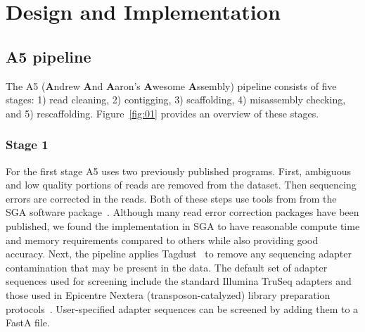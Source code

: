 \documentclass[10pt]{article}
\begin{document}
\section*{Design and Implementation}

\subsection*{A5 pipeline}

The A5 (\textbf{A}ndrew \textbf{A}nd \textbf{A}aron's \textbf{A}wesome \textbf{A}ssembly) pipeline consists of five 
stages: 1) read cleaning, 2) contigging, 3) scaffolding, 4) misassembly checking, and 5) rescaffolding. 
Figure~\ref{fig:01} provides an overview of these stages. 

\subsubsection*{Stage 1}
For the first stage A5 uses two previously published programs. First, 
ambiguous and low quality portions of reads are removed from the dataset. Then sequencing errors are corrected in the reads. Both of these 
steps use tools from from the SGA software package~\cite{Simpson2010}.  Although many read error correction packages have been published,
we found the implementation in SGA to have reasonable compute time and memory requirements compared to others while also providing 
good accuracy.  Next, the pipeline applies Tagdust~\cite{Lassmann2009} to remove any 
sequencing adapter contamination that may be present in the data. The default set of adapter sequences used for screening
include the standard Illumina TruSeq adapters and those used in Epicentre Nextera (transposon-catalyzed) library preparation protocols~\cite{Adey2010}. 
User-specified adapter sequences can be screened by adding them to a FastA file. 
\end{document}
